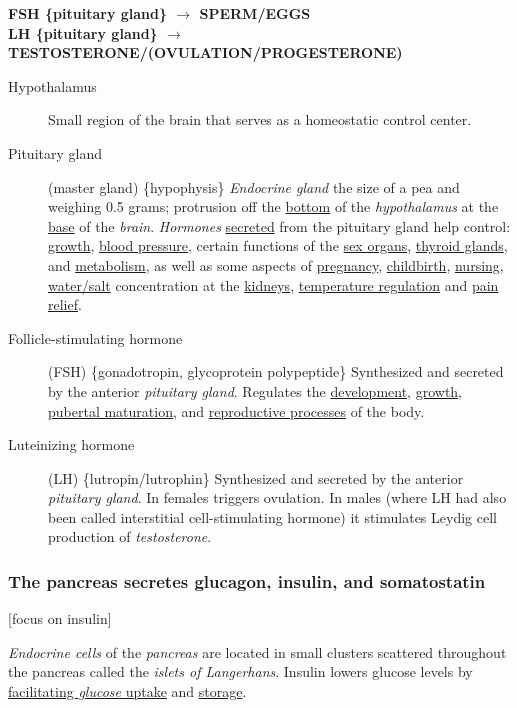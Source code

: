 \documentclass[11pt]{article}
\begin{document}
\textbf{FSH \{pituitary gland\} \(\rightarrow\) SPERM/EGGS} \\
\textbf{LH \{pituitary gland\} \(\rightarrow\) TESTOSTERONE/(OVULATION/PROGESTERONE)} \\

\begin{description}
\item[{Hypothalamus}] Small region of the brain that serves as a homeostatic control
center.
\item[{Pituitary gland}] (master gland) \{hypophysis\} \emph{Endocrine gland} the size of a
pea and weighing 0.5 grams; protrusion off the \uline{bottom} of the \emph{hypothalamus}
at the \uline{base} of the \emph{brain}. \emph{Hormones} \uline{secreted} from the pituitary gland help
control: \uline{growth}, \uline{blood pressure}, certain functions of the \uline{sex organs},
\uline{thyroid glands}, and \uline{metabolism}, as well as some aspects of \uline{pregnancy},
\uline{childbirth}, \uline{nursing}, \uline{water/salt} concentration at the \uline{kidneys}, \uline{temperature
regulation} and \uline{pain relief}.
\item[{Follicle-stimulating hormone}] (FSH) \{gonadotropin, glycoprotein polypeptide\}
Synthesized and secreted by the anterior \emph{pituitary gland}. Regulates the
\uline{development}, \uline{growth}, \uline{pubertal maturation}, and \uline{reproductive processes} of the
body.
\item[{Luteinizing hormone}] (LH) \{lutropin/lutrophin\} Synthesized and secreted by
the anterior \emph{pituitary gland}. In females triggers ovulation. In males
(where LH had also been called interstitial cell-stimulating hormone) it
stimulates Leydig cell production of \emph{testosterone}.
\end{description}

\subsubsection{The pancreas secretes glucagon, insulin, and somatostatin}
\label{sec:org42f12cd}
[focus on insulin]

\emph{Endocrine cells} of the \emph{pancreas} are located in small clusters scattered
throughout the pancreas called the \emph{islets of Langerhans}. Insulin lowers glucose
levels by \uline{facilitating \emph{glucose} uptake} and \uline{storage}.
\end{document}
